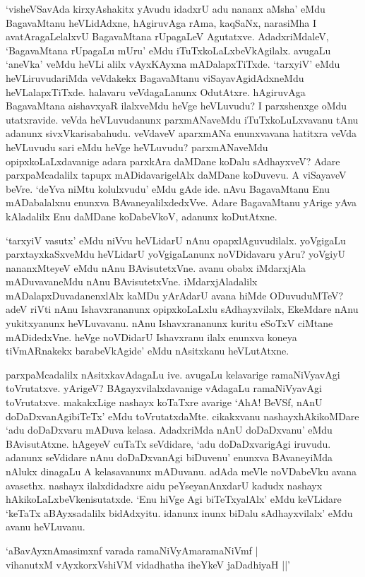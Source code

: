 `visheVSavAda kirxyAshakitx yAvudu idadxrU adu nananx aMsha' eMdu BagavaMtanu heVLidAdxne, hAgiruvAga rAma, kaqSaNx, narasiMha I avatAragaLelalxvU BagavaMtana rUpagaLeV Agutatxve. AdadxriMdaleV, `BagavaMtana rUpagaLu mUru' eMdu iTuTxkoLaLxbeVkAgilalx. avugaLu `aneVka' veMdu heVLi alilx vAyxKAyxna mADalapxTiTxde. `tarxyiV' eMdu heVLiruvudariMda veVdakekx BagavaMtanu viSayavAgidAdxneMdu heVLalapxTiTxde. halavaru veVdagaLanunx OdutAtxre. hAgiruvAga BagavaMtana aishavxyaR ilalxveMdu heVge heVLuvudu? I parxshenxge oMdu utatxravide. veVda heVLuvudanunx parxmANaveMdu iTuTxkoLuLxvavanu tAnu adanunx  sivxVkarisabahudu. veVdaveV aparxmANa enunxvavana hatitxra veVda heVLuvudu sari eMdu heVge heVLuvudu? parxmANaveMdu opipxkoLaLxdavanige adara parxkAra daMDane koDalu sAdhayxveV? Adare parxpaMcadalilx tapupx mADidavarigelAlx daMDane koDuvevu. A viSayaveV beVre. `deYva niMtu kolulxvudu' eMdu gAde ide. nAvu BagavaMtanu Enu mADabalalxnu enunxva BAvaneyalilxdedxVve. Adare BagavaMtanu yArige yAva kAladalilx Enu daMDane koDabeVkoV, adanunx koDutAtxne.

`tarxyiV vasutx' eMdu niVvu heVLidarU nAnu opapxlAguvudilalx. yoVgigaLu parxtayxkaSxveMdu heVLidarU yoVgigaLanunx noVDidavaru yAru? yoVgiyU nananxMteyeV eMdu nAnu BAvisutetxVne. avanu obabx iMdarxjAla mADuvavaneMdu nAnu BAvisutetxVne. iMdarxjAladalilx mADalapxDuvadanenxlAlx kaMDu yArAdarU avana hiMde ODuvuduMTeV? adeV riVti nAnu Ishavxrananunx opipxkoLaLxlu sAdhayxvilalx, EkeMdare nAnu yukitxyanunx heVLuvavanu. nAnu Ishavxrananunx kuritu eSoTxV ciMtane mADidedxVne. heVge noVDidarU Ishavxranu ilalx enunxva koneya tiVmARnakekx barabeVkAgide' eMdu nAsitxkanu heVLutAtxne.

parxpaMcadalilx nAsitxkavAdagaLu ive. avugaLu kelavarige ramaNiVyavAgi toVrutatxve. yArigeV? BAgayxvilalxdavanige vAdagaLu ramaNiVyavAgi toVrutatxve. makakxLige nashayx koTaTxre avarige `AhA! BeVSf, nAnU doDaDxvanAgibiTeTx' eMdu toVrutatxdaMte. cikakxvanu nashayxhAkikoMDare `adu doDaDxvaru mADuva kelasa. AdadxriMda nAnU doDaDxvanu' eMdu BAvisutAtxne. hAgeyeV cuTaTx seVdidare, `adu doDaDxvarigAgi iruvudu. adanunx seVdidare nAnu doDaDxvanAgi biDuvenu' enunxva BAvaneyiMda nAlukx dinagaLu A kelasavanunx mADuvanu. adAda meVle noVDabeVku avana avasethx. nashayx ilalxdidadxre aidu peYseyanAnxdarU kadudx nashayx hAkikoLaLxbeVkenisutatxde. `Enu hiVge Agi biTeTxyalAlx' eMdu keVLidare `keTaTx aBAyxsadalilx bidAdxyitu. idanunx inunx biDalu sAdhayxvilalx' eMdu avanu heVLuvanu.

\begin{shloka}
`aBavAyxnAmasimxnf varada ramaNiVyAmaramaNiVmf |\\
vihanutxM vAyxkorxVshiVM vidadhatha iheYkeV jaDadhiyaH ||'
\end{shloka}

